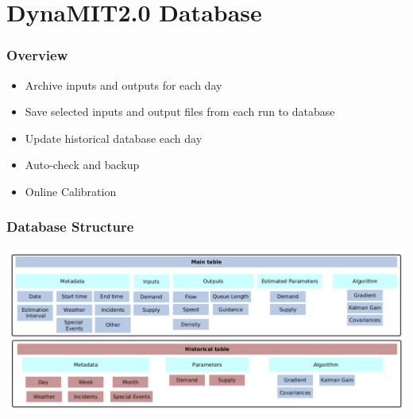 \documentclass[12pt]{beamer}
\begin{document}
%
%

\section{DynaMIT2.0 Database}

\begin{frame}
\frametitle{Overview}
\begin{itemize}
\item Archive inputs and outputs for each day
\item Save selected inputs and output files from each run to database
\item Update historical database each day 
\item Auto-check and backup
\item Online Calibration
\end{itemize}
\end{frame}

\begin{frame}
\frametitle{Database Structure}
\vspace{-1 cm}
\includegraphics[scale=0.3]{table3.png}
\end{frame}
\end{document}

